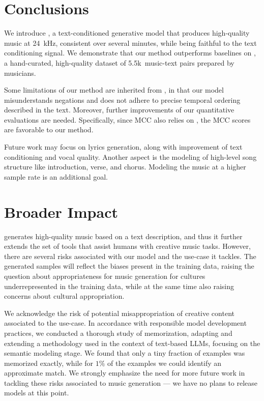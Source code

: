 \section{Conclusions}
\label{sec:conclusions}

We introduce {\model}, a text-conditioned generative model that produces high-quality music at 24~kHz, consistent over several minutes, while being faithful to the text conditioning signal. We demonstrate that our method outperforms baselines on {\dataset}, a hand-curated, high-quality dataset of 5.5k~music-text pairs prepared by musicians.

Some limitations of our method are inherited from {\mulan}, in that our model misunderstands negations and does not adhere to precise temporal ordering described in the text. Moreover, further improvements of our quantitative evaluations are needed. Specifically, since MCC also relies on {\mulan}, the MCC scores are favorable to our method.

Future work may focus on lyrics generation, along with improvement of text conditioning and vocal quality. Another aspect is the modeling of high-level song structure like introduction, verse, and chorus. Modeling the music at a higher sample rate is an additional goal.
\section{Broader Impact}
\label{sec:broader-impact}

{\model} generates high-quality music based on a text description, and thus it further extends the set of tools that assist humans with creative music tasks. However, there are several risks associated with our model and the use-case it tackles. The generated samples will reflect the biases present in the training data, raising the question about appropriateness for music generation for cultures underrepresented in the training data, while at the same time also raising concerns about cultural appropriation. 

We acknowledge the risk of potential misappropriation of creative content associated to the use-case. In accordance with responsible model development practices, we conducted a thorough study of memorization, adapting and extending a methodology used in the context of text-based LLMs, focusing on the semantic modeling stage. We found that only a tiny fraction of examples was memorized exactly, while for $1\%$ of the examples we could identify an approximate match. We strongly emphasize the need for more future work in tackling these risks associated to music generation --- we have no plans to release models at this point.

\newpage

